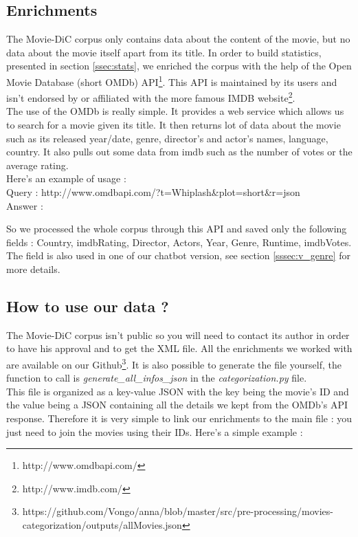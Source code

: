 \subsection{Enrichments}
\label{ssec:enrich}
The Movie-DiC corpus only contains data about the content of the movie, but no data about the movie itself apart from its title. In order to build statistics, presented in section \ref{ssec:stats}, we enriched the corpus with the help of the Open Movie Database (short OMDb) API\footnote{http://www.omdbapi.com/}. This API is maintained by its users and isn't endorsed by or affiliated with the more famous IMDB website\footnote{http://www.imdb.com/}.\\
The use of the OMDb is really simple. It provides a web service which allows us to search for a movie given its title. It then returns lot of data about the movie such as its released year/date, genre, director's and actor's names, language, country. It also pulls out some data from imdb such as the number of votes or the average rating.\\
Here's an example of usage :\\
Query : http://www.omdbapi.com/?t=Whiplash\&plot=short\&r=json\\
Answer :

So we processed the whole corpus through this API and saved only the following fields : Country, imdbRating, Director, Actors, Year, Genre, Runtime, imdbVotes. \\
The  field is also used in one of our chatbot version, see section \ref{sssec:v_genre} for more details.

\newpage
\subsection{How to use our data ?} %
\label{sub:how_to_use_our_data_}
The Movie-DiC corpus isn't public so you will need to contact its author in order to have his approval and to get the XML file. All the enrichments we worked with are available on our Github\footnote{https://github.com/Vongo/anna/blob/master/src/pre-processing/movies-categorization/outputs/allMovies.json}. It is also possible to generate the file yourself, the function to call is \emph{generate\_all\_infos\_json} in the \emph{categorization.py} file.\\

This file is organized as a key-value JSON with the key being the movie's ID and the value being a JSON containing all the details we kept from the OMDb's API response. Therefore it is very simple to link our enrichments to the main file : you just need to join the movies using their IDs. Here's a simple example :


